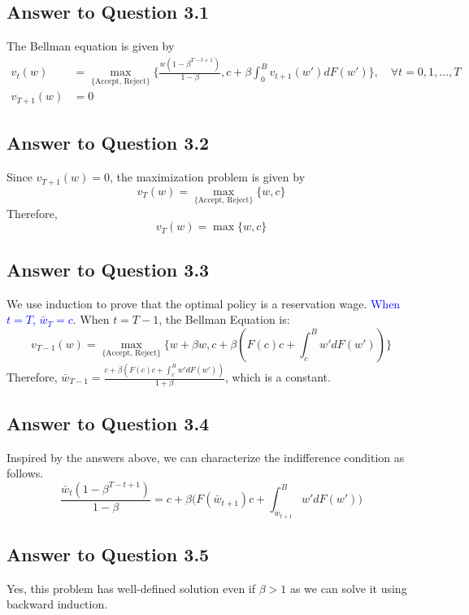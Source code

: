 \documentclass[11pt]{article}
\theoremstyle{definition}
\theoremstyle{boldtitle} %
\numberwithin{equation}{section}
\numberwithin{figure}{section}
\numberwithin{table}{section}
\begin{document}
\subsection*{Answer to Question 3.1}
The Bellman equation is given by 
\begin{equation}
  \begin{aligned}
  v_t(w) & = \max_{\text{\{Accept, Reject\}}} \Bigg\{ \frac{w (1 - \beta^{T-t+1})}{1 - \beta}, c + \beta \int_{0}^B v_{t+1}(w')dF(w') \Bigg\}, \quad \forall t = 0, 1, \dots, T \\
  v_{T+1}(w) & = 0
  \end{aligned}
\end{equation}

\subsection*{Answer to Question 3.2}
Since $v_{T+1}(w) = 0$, the maximization problem is given by 
\[
v_T(w) = \max_{\text{\{Accept, Reject\}}} \{w, c \}
\]
Therefore, 
\[
v_T(w) = \max \{w, c \}
\]

\subsection*{Answer to Question 3.3}
We use induction to prove that the optimal policy is a reservation wage.
\textcolor{blue}{When $t = T$, $\bar{w}_T = c$}.
When $t = T-1$, the Bellman Equation is:
\[
v_{T-1}(w) = \max_{\text{\{Accept, Reject\}}} \{w + \beta w, c + \beta(F(c)c + \int_{c}^B w' dF(w')) \}
\]
Therefore, $\bar{w}_{T-1} = \frac{c + \beta(F(c)c + \int_{c}^B w' dF(w'))}{1 + \beta}$, which is a constant.


\subsection*{Answer to Question 3.4}
Inspired by the answers above,
we can characterize the indifference condition as follows. 
\[
\frac{\bar{w}_t (1 - \beta^{T-t+1})}{1 - \beta} = c + \beta \bigg(F(\bar{w}_{t+1}) c + \int_{\bar{w}_{t+1}}^B w' dF(w') \bigg)
\]



\subsection*{Answer to Question 3.5}
Yes, this problem has well-defined solution even if $\beta > 1$ as we can solve it using backward induction.
\end{document}
